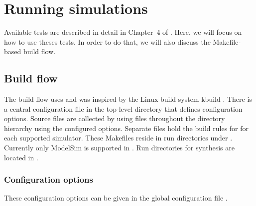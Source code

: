\chapter{Running simulations}

Available tests are described in detail in Chapter~4 of \cite{friedmann13phd}.
Here, we will focus on how to use theses tests.
In order to do that, we will also discuss the Makefile-based build flow.


\section{Build flow}
The build flow uses  and was inspired by the Linux build system kbuild \citep{kbuild}.
There is a central configuration file  in the top-level directory that defines configuration options.
Source files are collected by using  files throughout the directory hierarchy using the configured options.
Separate files  hold the build rules for  for each supported simulator.
These Makefiles reside in run directories under .
Currently only ModelSim is supported in .
Run directories for synthesis are located in .


\subsection{Configuration options}

These configuration options can be given in the global configuration file .

